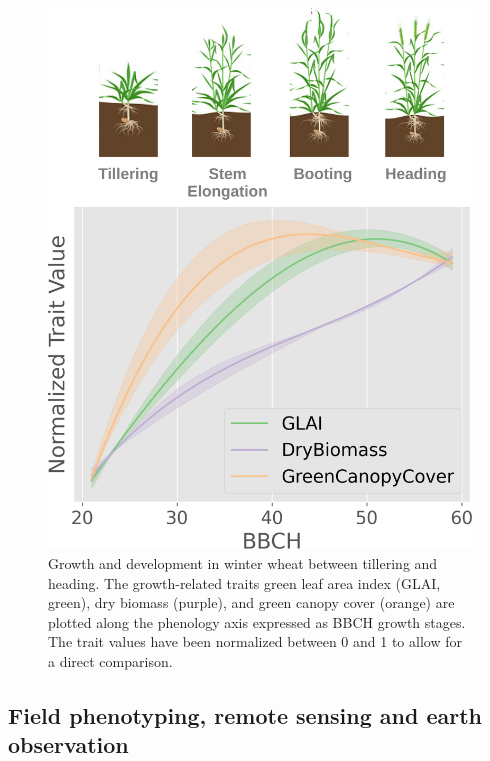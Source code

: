 \begin{figure}[H]
    \centering
    \includegraphics[width=\textwidth]{01-Introduction/img/figure_growth_and_development.jpeg}
    \caption{Growth and development in winter wheat between tillering and heading. The growth-related traits green leaf area index (GLAI, green), dry biomass (purple), and green canopy cover (orange) are plotted along the phenology axis expressed as BBCH growth stages. The trait values have been normalized between 0 and 1 to allow for a direct comparison.}
    \label{fig:ww-growth-development}
\end{figure}


\subsection{Field phenotyping, remote sensing and earth observation}

